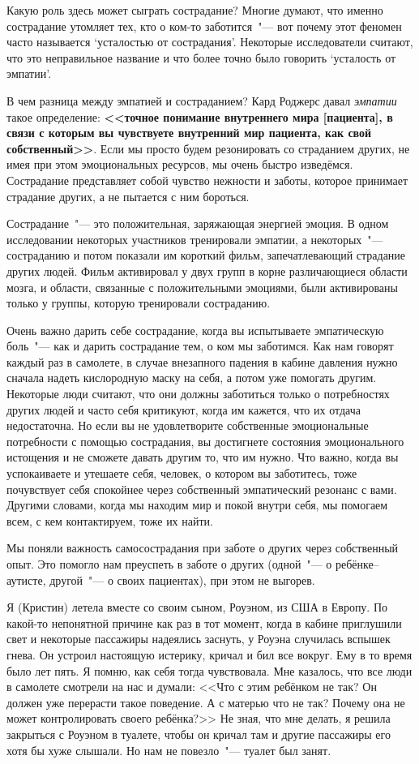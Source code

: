 Какую роль здесь может сыграть сострадание? Многие думают, что именно сострадание утомляет тех, кто о ком-то заботится~"--- вот почему этот феномен часто называется ‘усталостью от сострадания’. Некоторые исследователи считают, что это неправильное название и что более точно было говорить ‘усталость от эмпатии’.

В чем разница между эмпатией и состраданием? Кард Роджерс давал \emph{эмпатии} такое определение: \textbf{<<точное понимание внутреннего мира [пациента], в связи с которым вы чувствуете внутренний мир пациента, как свой собственный>>}. Если мы просто будем резонировать со страданием других, не имея при этом эмоциональных ресурсов, мы очень быстро изведёмся. Сострадание представляет собой чувство нежности и заботы, которое принимает страдание других, а не пытается с ним бороться.

Сострадание~"--- это положительная, заряжающая энергией эмоция. В одном исследовании некоторых участников тренировали эмпатии, а некоторых~"--- состраданию и потом показали им короткий фильм, запечатлевающий страдание других людей. Фильм активировал у двух групп в корне различающиеся области мозга, и области, связанные с положительными эмоциями, были активированы только у группы, которую тренировали состраданию.

Очень важно дарить себе сострадание, когда вы испытываете эмпатическую боль~"--- как и дарить сострадание тем, о ком мы заботимся. Как нам говорят каждый раз в самолете, в случае внезапного падения в кабине давления нужно сначала надеть кислородную маску на себя, а потом уже помогать другим. Некоторые люди считают, что они должны заботиться только о потребностях других людей и часто себя критикуют, когда им кажется, что их отдача недостаточна. Но если вы не удовлетворите собственные эмоциональные потребности с помощью сострадания, вы достигнете состояния эмоционального истощения и не сможете давать другим то, что им нужно. Что важно, когда вы успокаиваете и утешаете себя, человек, о котором вы заботитесь, тоже почувствует себя спокойнее через собственный эмпатический резонанс с вами. Другими словами, когда мы находим мир и покой внутри себя, мы помогаем всем, с кем контактируем, тоже их найти.  

Мы поняли важность самосострадания при заботе о других через собственный опыт. Это помогло нам преуспеть в заботе о других (одной~"--- о ребёнке--аутисте, другой~"--- о своих пациентах), при этом не выгорев.

Я (Кристин) летела вместе со своим сыном, Роуэном, из США в Европу. По какой-то непонятной причине как раз в тот момент, когда в кабине приглушили свет и некоторые пассажиры надеялись заснуть, у Роуэна случилась вспышек гнева. Он устроил настоящую истерику, кричал и бил все вокруг. Ему в то время было лет пять. Я помню, как себя тогда чувствовала. Мне казалось, что все люди в самолете смотрели на нас и думали: <<Что с этим ребёнком не так? Он должен уже перерасти такое поведение. А с матерью что не так? Почему она не может контролировать своего ребёнка?>> Не зная, что мне делать, я решила закрыться с Роуэном в туалете, чтобы он кричал там и другие пассажиры его хотя бы хуже слышали. Но нам не повезло~"--- туалет был занят. 

